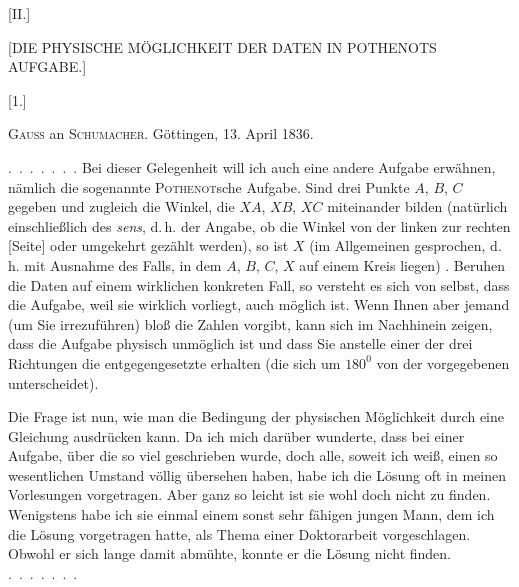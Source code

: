 \clearpage{}

\begin{center}
[II.]

[DIE PHYSISCHE MÖGLICHKEIT DER DATEN IN POTHENOTS AUFGABE.]

[1.]
\end{center}

\begin{center}
\textsc{Gauss} an \textsc{Schumacher}. Göttingen, 13. April 1836.
\end{center}

\indent \mbox{. . . . . . .} Bei dieser Gelegenheit will ich auch eine andere Aufgabe erwähnen, nämlich die sogenannte \textsc{Pothenot}sche Aufgabe. Sind drei Punkte $A$, $B$, $C$ gegeben und zugleich die Winkel, die $XA$, $XB$, $XC$ miteinander bilden (natürlich einschließlich des \emph{sens}, d.\,h. der Angabe, ob die Winkel von der linken zur rechten [Seite] oder umgekehrt gezählt werden), so ist $X$ (im Allgemeinen gesprochen, d.\,h. mit Ausnahme des Falls, in dem $A$, $B$, $C$, $X$ auf einem Kreis liegen) . Beruhen die Daten auf einem wirklichen konkreten Fall, so versteht es sich von selbst, dass die Aufgabe, weil sie wirklich vorliegt, auch möglich ist. Wenn Ihnen aber jemand (um Sie irrezuführen) bloß die Zahlen vorgibt, kann sich im Nachhinein zeigen, dass die Aufgabe physisch unmöglich ist und dass Sie anstelle einer der drei Richtungen die entgegengesetzte erhalten (die sich um $180^0$ von der vorgegebenen unterscheidet).

Die Frage ist nun, wie man  die Bedingung der physischen Möglichkeit durch eine Gleichung  ausdrücken kann. Da ich mich darüber wunderte, dass bei einer Aufgabe, über die so viel geschrieben wurde, doch alle, soweit ich weiß, einen so wesentlichen Umstand völlig übersehen haben, habe ich die Lösung oft in meinen Vorlesungen vorgetragen. Aber ganz so leicht ist sie wohl doch nicht zu finden. Wenigstens habe ich sie einmal einem sonst sehr fähigen jungen Mann, dem ich die Lösung  vorgetragen hatte, als Thema einer Doktorarbeit vorgeschlagen. Obwohl er sich lange damit abmühte, konnte er die Lösung nicht finden. \mbox{. . . . . . .}

